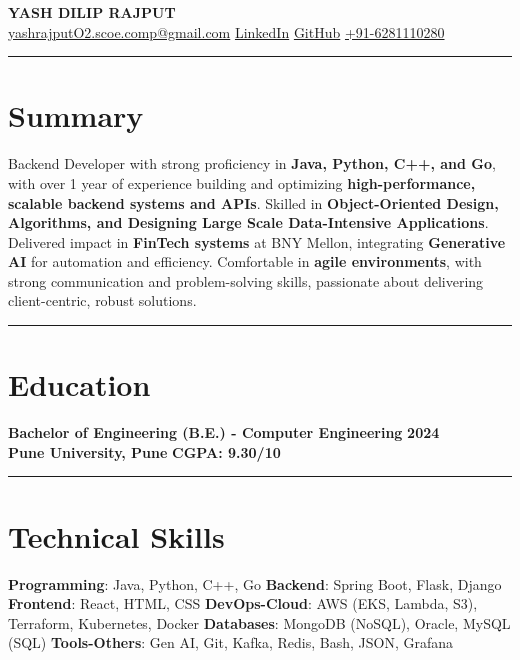 \documentclass[a4paper,10.8pt]{article}
\begin{document}
\begin{center}
    {\LARGE \textbf{YASH DILIP RAJPUT}}\\
    \href{mailto:yashrajputO2.scoe.comp@gmail.com}{yashrajputO2.scoe.comp@gmail.com} \textbar
    \href{https://www.linkedin.com/in/yashrajput7232}{LinkedIn} \textbar
    \href{https://github.com/yashrajput7232}{GitHub} \textbar
    \href{tel:+916281110280}{+91-6281110280}
\end{center}

\hrule
\vspace{3pt}
\section*{Summary}  
Backend Developer with strong proficiency in \textbf{Java, Python, C++, and Go}, with over 1 year of experience building and optimizing \textbf{high-performance, scalable backend systems and APIs}. Skilled in \textbf{Object-Oriented Design, Algorithms, and Designing Large Scale Data-Intensive Applications}. Delivered impact in \textbf{FinTech systems} at BNY Mellon, integrating \textbf{Generative AI} for automation and efficiency. Comfortable in \textbf{agile environments}, with strong communication and problem-solving skills, passionate about delivering client-centric, robust solutions.

\vspace{3 pt}
\hrule
\vspace{3pt}

\section*{Education}
\textbf{Bachelor of Engineering (B.E.) - Computer Engineering} \hfill \textbf{2024} \\
\textbf{Pune University, Pune} \hfill \textbf{CGPA: 9.30/10}
\vspace{3pt}

\hrule
\vspace{3 pt}

\section*{Technical Skills}
\textbf{Programming}: Java, Python, C++, Go \textbar \space
\textbf{Backend}: Spring Boot, Flask, Django \textbar \space
\textbf{Frontend}: React, HTML, CSS \textbar \space
\textbf{DevOps-Cloud}: AWS (EKS, Lambda, S3), Terraform, Kubernetes, Docker \textbar \space
\textbf{Databases}: MongoDB (NoSQL), Oracle, MySQL (SQL) \textbar \space
\textbf{Tools-Others}: Gen AI, Git, Kafka, Redis, Bash, JSON, Grafana
\vspace{3}
\end{document}
